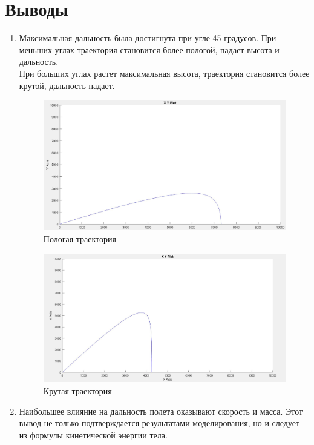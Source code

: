 \documentclass{article}
\begin{document}
	\section{Выводы}
	\begin{enumerate}
		\item Максимальная дальность была достигнута при угле 45 градусов. При меньших углах траектория становится более пологой, падает высота и дальность.\\
		При больших углах растет максимальная высота, траектория становится более крутой, дальность падает.\\
		\begin{figure}[H]
			\centering
			\includegraphics[width=0.7\linewidth]{graph2}
			\caption{Пологая траектория}
			\label{fig:graph2}
		\end{figure}
		\begin{figure}[H]
			\centering
			\includegraphics[width=0.7\linewidth]{graph3}
			\caption{Крутая траектория}
			\label{fig:graph3}
		\end{figure}
	\item Наибольшее влияние на дальность полета оказывают скорость и масса. Этот вывод не только подтверждается результатами моделирования, но и следует из формулы кинетической энергии тела.
	\end{enumerate}
	
\end{document}
